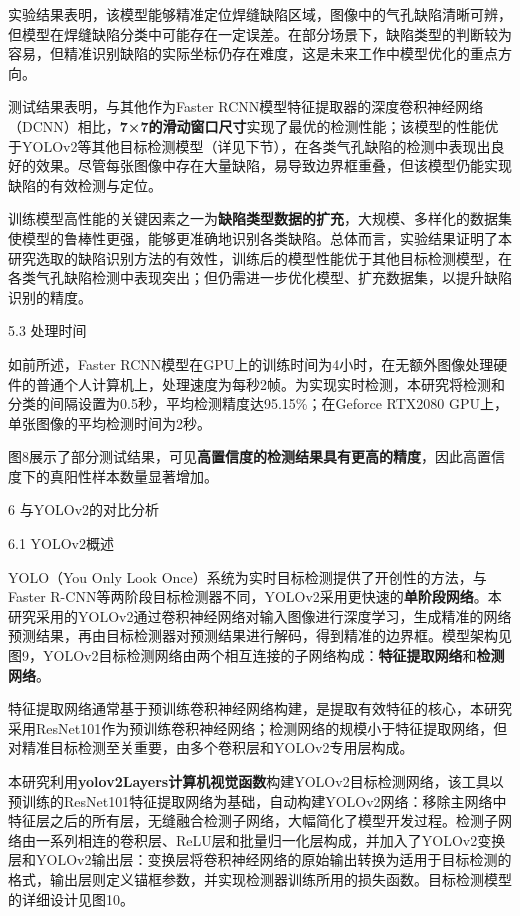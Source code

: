实验结果表明，该模型能够精准定位焊缝缺陷区域，图像中的气孔缺陷清晰可辨，但模型在焊缝缺陷分类中可能存在一定误差。在部分场景下，缺陷类型的判断较为容易，但精准识别缺陷的实际坐标仍存在难度，这是未来工作中模型优化的重点方向。

测试结果表明，与其他作为Faster
RCNN模型特征提取器的深度卷积神经网络（DCNN）相比，\textbf{7×7的滑动窗口尺寸}实现了最优的检测性能；该模型的性能优于YOLOv2等其他目标检测模型（详见下节），在各类气孔缺陷的检测中表现出良好的效果。尽管每张图像中存在大量缺陷，易导致边界框重叠，但该模型仍能实现缺陷的有效检测与定位。

训练模型高性能的关键因素之一为\textbf{缺陷类型数据的扩充}，大规模、多样化的数据集使模型的鲁棒性更强，能够更准确地识别各类缺陷。总体而言，实验结果证明了本研究选取的缺陷识别方法的有效性，训练后的模型性能优于其他目标检测模型，在各类气孔缺陷检测中表现突出；但仍需进一步优化模型、扩充数据集，以提升缺陷识别的精度。

5.3 处理时间

如前所述，Faster
RCNN模型在GPU上的训练时间为4小时，在无额外图像处理硬件的普通个人计算机上，处理速度为每秒2帧。为实现实时检测，本研究将检测和分类的间隔设置为0.5秒，平均检测精度达95.15\%；在Geforce
RTX2080 GPU上，单张图像的平均检测时间为2秒。

图8展示了部分测试结果，可见\textbf{高置信度的检测结果具有更高的精度}，因此高置信度下的真阳性样本数量显著增加。

6 与YOLOv2的对比分析

6.1 YOLOv2概述

YOLO（You Only Look Once）系统为实时目标检测提供了开创性的方法，与Faster
R-CNN等两阶段目标检测器不同，YOLOv2采用更快速的\textbf{单阶段网络}。本研究采用的YOLOv2通过卷积神经网络对输入图像进行深度学习，生成精准的网络预测结果，再由目标检测器对预测结果进行解码，得到精准的边界框。模型架构见图9，YOLOv2目标检测网络由两个相互连接的子网络构成：\textbf{特征提取网络}和\textbf{检测网络}。

特征提取网络通常基于预训练卷积神经网络构建，是提取有效特征的核心，本研究采用ResNet101作为预训练卷积神经网络；检测网络的规模小于特征提取网络，但对精准目标检测至关重要，由多个卷积层和YOLOv2专用层构成。

本研究利用\textbf{yolov2Layers计算机视觉函数}构建YOLOv2目标检测网络，该工具以预训练的ResNet101特征提取网络为基础，自动构建YOLOv2网络：移除主网络中特征层之后的所有层，无缝融合检测子网络，大幅简化了模型开发过程。检测子网络由一系列相连的卷积层、ReLU层和批量归一化层构成，并加入了YOLOv2变换层和YOLOv2输出层：变换层将卷积神经网络的原始输出转换为适用于目标检测的格式，输出层则定义锚框参数，并实现检测器训练所用的损失函数。目标检测模型的详细设计见图10。

